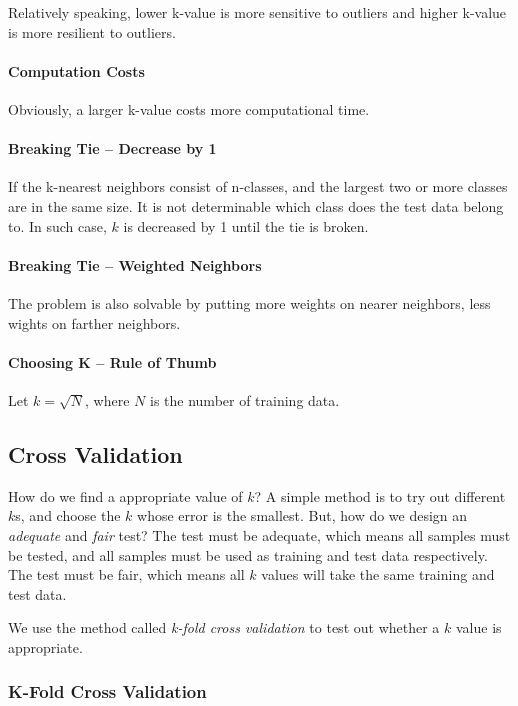 \documentclass{note}
\begin{document}
Relatively speaking, lower k-value is more sensitive to outliers and higher k-value is more resilient to outliers.

\paragraph{Computation Costs}

Obviously, a larger k-value costs more computational time. 

\paragraph{Breaking Tie -- Decrease by 1}

If the k-nearest neighbors consist of n-classes, and the largest two or more classes are in the same size. It is not determinable which class does the test data belong to. In such case, $k$ is decreased by 1 until the tie is broken.

\paragraph{Breaking Tie -- Weighted Neighbors}

The problem is also solvable by putting more weights on nearer neighbors, less wights on farther neighbors.

\paragraph{Choosing K -- Rule of Thumb}

Let $k = \sqrt{N}$, where $N$ is the number of training data.

\subsection{Cross Validation}

How do we find a appropriate value of $k$? A simple method is to try out different $k$s, and choose the $k$ whose error is the smallest. But, how do we design an \textit{adequate} and \textit{fair} test? The test must be adequate, which means all samples must be tested, and all samples must be used as training and test data respectively. The test must be fair, which means all $k$ values will take the same training and test data.

We use the method called \textit{k-fold cross validation} to test out whether a $k$ value is appropriate.

\subsubsection{K-Fold Cross Validation}
\end{document}
